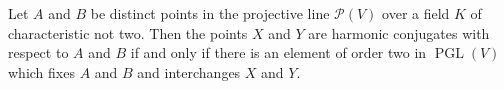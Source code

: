 Let $A$ and $B$ be distinct points in the projective line $\mathcal{P}(V)$ over a field $K$ of characteristic not two. Then the points $X$ and $Y$ are harmonic conjugates with respect to $A$ and $B$ if and only if there is an element of order two in $\operatorname{PGL}(V)$ which fixes $A$ and $B$ and interchanges $X$ and $Y$.